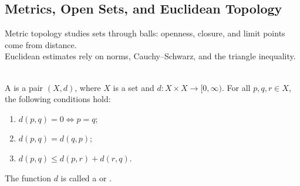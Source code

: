 \subsection{Metrics, Open Sets, and Euclidean Topology}\label{subsec:metric-spaces-and-euclidean-topology}

%


Metric topology studies sets through balls: openness, closure, and limit points come from distance.\\
Euclidean estimates rely on norms, Cauchy--Schwarz, and the triangle inequality.

\begin{definition} \label{def:metric-space} \\
A  is a pair $(X,d)$, where $X$ is a set and $d:X\times X\to[0,\infty)$. For all $p,q,r\in X$, the following conditions hold:
\begin{enumerate}[label=\roman*.]
\setlength{\itemsep}{0pt}
\item $d(p,q)=0\Longleftrightarrow p=q$;
\item $d(p,q)=d(q,p)$;
\item $d(p,q)\leq d(p,r)+d(r,q)$.
\end{enumerate}
The function $d$ is called a  or .
\end{definition}

